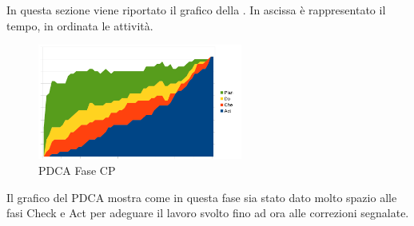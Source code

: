 In questa sezione viene riportato il grafico  della . In ascissa è rappresentato il tempo, in ordinata le attività.
\begin{figure}[H]
	\centering
	\includegraphics[width=0.6\textwidth]{PianoDiQualifica/Pics/GraficoPDCAFaseSD.pdf}
	\caption{PDCA Fase CP}
\end{figure}
Il grafico del PDCA mostra come in questa fase sia stato dato molto spazio alle fasi Check e Act per adeguare il lavoro svolto fino ad ora alle correzioni segnalate.

							






